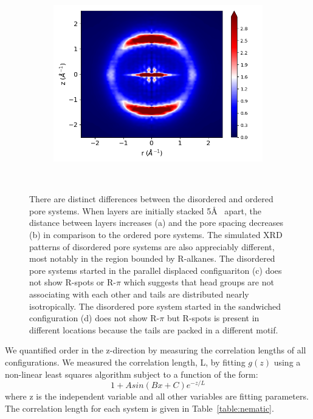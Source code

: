 \documentclass[journal=jpcbfk,manusciprt=article]{achemso}
\begin{document}
\begin{figure}[!hbt]
        \begin{subfigure}{0.45\linewidth}
                \centering
                \includegraphics[width=\linewidth]{disorder_rzplot.png}
                \caption{}~\label{fig:layered_disordered_xrd}
        \end{subfigure}
	\caption{There are distinct differences between the disordered and ordered pore systems. 
		When layers are initially stacked 5\AA~ apart, the distance
		between layers increases (a) and the pore spacing decreases (b) in comparison to
		the ordered pore systems. The simulated
		XRD patterns of disordered pore systems are also appreciably different, most 
		notably in the region bounded by R-alkanes. The disordered pore
		systems started in the parallel displaced configuariton (c) does not show R-spots
		or R-$\pi$ which suggests that head groups are not associating with each other
		and tails are distributed nearly isotropically. The disordered pore system
		started in the sandwiched configuration (d) does not show R-$\pi$ but R-spots 
		is present in different locations because the tails are packed in a different
		motif.}
  \end{figure}


  We quantified order in the z-direction by measuring the correlation lengths
  of all configurations. We measured the correlation length, L, by fitting $g(z)$
  using a non-linear least squares algorithm subject to a function of the form:
  \begin{equation}
  	1 + Asin(Bx + C)e^{-z/L}
        \label{eqn:correlation_fit}
  \end{equation}
  where z is the independent variable and all other variables are fitting
  parameters. The correlation length for each system is given in
  Table~\ref{table:nematic}.
\end{document}
